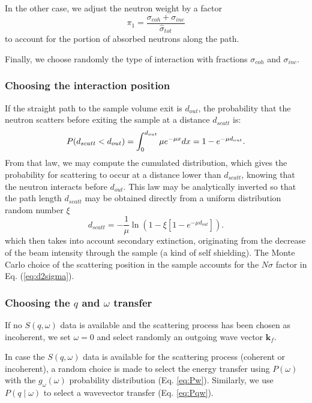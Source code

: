 In the other case, we adjust the neutron weight by a factor
\begin{equation}
\pi_1 = \frac{\sigma_{coh} + \sigma_{inc}}{\hat{\sigma}_{tot}}
\end{equation}
to account for the portion of absorbed neutrons along the path.

Finally, we choose randomly the type of interaction with fractions $\sigma_{coh}$ and $\sigma_{inc}$.

\subsubsection{Choosing the interaction position}

If the straight path to the sample volume exit is $d_{out}$, the probability that the neutron scatters before exiting the sample at a distance $d_{scatt}$ is:
\begin{equation}
P(d_{scatt} < d_{out}) = \int_0^{d_{out}} \mu e^{-\mu x}dx = 1 - e^{-\mu d_{out}}. \\
\end{equation}
From that law, we may compute the cumulated distribution, which gives the probability for scattering to occur at a distance lower than $d_{scatt}$, knowing that the neutron interacts before $d_{out}$. This law may be analytically inverted so that the path length $d_{scatt}$ may be obtained directly from a uniform distribution random number $\xi$
\begin{equation}
d_{scatt} = -\frac{1}{\mu} \ln(1 - \xi[1 -e^{-\mu d_{out}}]).
\end{equation}
which then takes into account secondary extinction, originating from the decrease of the beam intensity through the sample (a kind of self shielding).
The Monte Carlo choice of the scattering position in the sample accounts for the $N \sigma$ factor in Eq. (\ref{eq:d2sigma}).

\subsubsection{Choosing the $q$ and $\omega$ transfer}

If no $S(q, \omega)$ data is available and the scattering process has been chosen as incoherent, we set $\omega=0$ and select randomly an outgoing wave vector $\boldsymbol{k}_f$.

In case the $S(q, \omega)$ data is available for the scattering process (coherent or incoherent), a random choice is made to select the energy transfer using $P(\omega)$ with the $g_\omega(\omega)$ probability distribution (Eq. \ref{eq:Pw}).
Similarly, we use $P(q \mid \omega)$ to select a wavevector transfer (Eq. \ref{eq:Pqw}).

